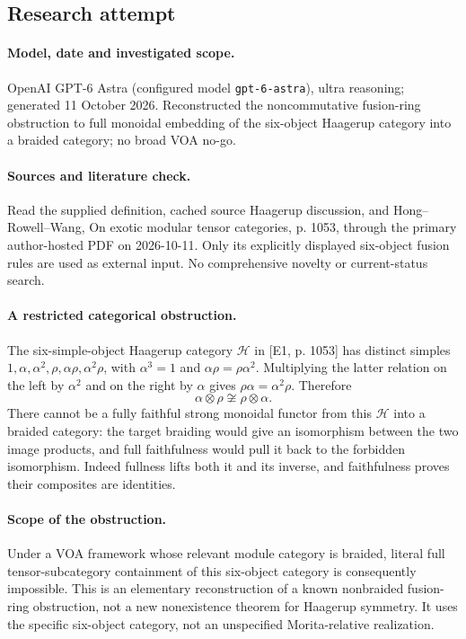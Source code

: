 \documentclass[11pt]{article}
\begin{document}
\subsection{Research attempt}
\paragraph{Model, date and investigated scope.}
OpenAI GPT-6 Astra (configured model \texttt{gpt-6-astra}), ultra reasoning; generated 11 October 2026. Reconstructed the noncommutative fusion-ring obstruction to full monoidal embedding of the six-object Haagerup category into a braided category; no broad VOA no-go.

\paragraph{Sources and literature check.}
Read the supplied definition, cached source Haagerup discussion, and Hong–Rowell–Wang, On exotic modular tensor categories, p. 1053, through the primary author-hosted PDF on 2026-10-11. Only its explicitly displayed six-object fusion rules are used as external input. No comprehensive novelty or current-status search.

\paragraph{A restricted categorical obstruction.} The six-simple-object Haagerup category \(\mathcal H\) in [E1, p. 1053] has distinct simples \(1,\alpha,\alpha^2,\rho,\alpha\rho,\alpha^2\rho\), with \(\alpha^3=1\) and \(\alpha\rho=\rho\alpha^2\). Multiplying the latter relation on the left by \(\alpha^2\) and on the right by \(\alpha\) gives \(\rho\alpha=\alpha^2\rho\). Therefore
\[
 \alpha\otimes\rho\not\cong\rho\otimes\alpha.
\]
There cannot be a fully faithful strong monoidal functor from this \(\mathcal H\) into a braided category: the target braiding would give an isomorphism between the two image products, and full faithfulness would pull it back to the forbidden isomorphism. Indeed fullness lifts both it and its inverse, and faithfulness proves their composites are identities.
\paragraph{Scope of the obstruction.} Under a VOA framework whose relevant module category is braided, literal full tensor-subcategory containment of this six-object category is consequently impossible. This is an elementary reconstruction of a known nonbraided fusion-ring obstruction, not a new nonexistence theorem for Haagerup symmetry. It uses the specific six-object category, not an unspecified Morita-relative realization.
\end{document}
